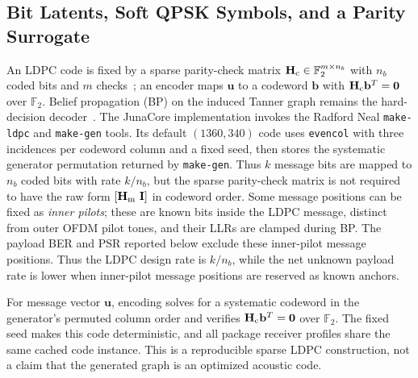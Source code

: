 \documentclass[journal]{IEEEtran}
\newcommand{\F}{\mathbb{F}}
\newcommand{\T}{^{T}}
\newcommand{\Hc}{\mathbf H_{\rm c}}
\newcommand{\Hm}{\mathbf H_{\rm m}}
\begin{document}
\subsection{Bit Latents, Soft QPSK Symbols, and a Parity Surrogate}
\label{ssec:ldpc}
An LDPC code is fixed by a sparse parity-check matrix $\Hc\in\F_2^{m\times
n_b}$ with $n_b$ coded bits and $m$ checks~\cite{gallager1963ldpc}; an encoder
maps $\mathbf u$ to a codeword $\mathbf b$ with $\Hc\mathbf b\T=\mathbf 0$
over $\F_2$. Belief propagation (BP) on the induced Tanner graph remains the
hard-decision decoder~\cite{richardson2008modern}. The JunaCore implementation
invokes the Radford Neal \texttt{make-ldpc} and \texttt{make-gen} tools. Its
default $(1360,340)$ code uses \texttt{evencol} with three incidences per
codeword column and a fixed seed, then stores the systematic generator
permutation returned by \texttt{make-gen}. Thus $k$ message bits are mapped to
$n_b$ coded bits with rate $k/n_b$, but the sparse parity-check matrix is not
required to have the raw form $[\Hm\ \mathbf I]$ in codeword order. Some message
positions can be fixed as \emph{inner pilots}; these are known bits inside the
LDPC message, distinct from outer OFDM pilot tones, and their LLRs are clamped
during BP. The payload BER and PSR reported below exclude these inner-pilot
message positions. Thus the LDPC design rate is $k/n_b$, while the net unknown
payload rate is lower when inner-pilot message positions are reserved as known
anchors.

For message vector $\mathbf u$, encoding solves for a systematic codeword in the
generator's permuted column order and verifies $\Hc\mathbf b\T=\mathbf0$ over
$\F_2$. The fixed seed makes this code deterministic, and all package receiver
profiles share the same cached code instance. This is a reproducible sparse
LDPC construction, not a claim that the generated graph is an optimized
acoustic code.
\end{document}
